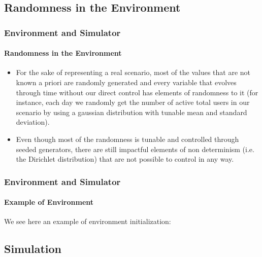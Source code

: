 \documentclass[11pt]{beamer}
\begin{document}

\subsection{Randomness in the Environment}


\begin{frame}

\frametitle{Environment and Simulator}
\framesubtitle{Randomness in the Environment}

\begin{itemize}[leftmargin=*, label={$\circ$}]
    \item For the sake of representing a real scenario, most of the values that are not known a priori are randomly generated and every variable that evolves through time without our direct control has elements of randomness to it (for instance, each day we randomly get the number of active total users in our scenario by using a gaussian distribution with tunable mean and standard deviation).
    \item Even though most of the randomness is tunable and controlled through seeded generators, there are still impactful elements of non determinism (i.e. the Dirichlet distribution) that are not possible to control in any way.
\end{itemize}

\end{frame}


\begin{frame}

\frametitle{Environment and Simulator}
\framesubtitle{Example of Environment}

We see here an example of environment initialization:



\end{frame}


\subsection{Simulation}
\end{document}
